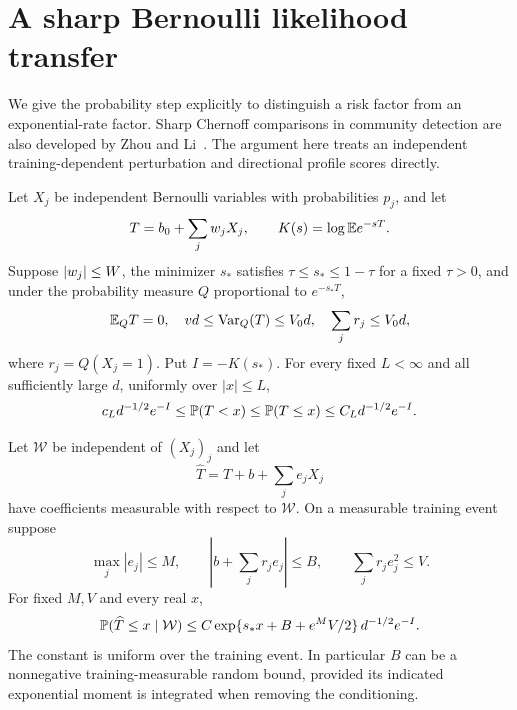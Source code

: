 \section{A sharp Bernoulli likelihood transfer}\label{sec:sharp}

We give the probability step explicitly to distinguish a risk factor from
an exponential-rate factor. Sharp Chernoff comparisons in community
detection are also developed by Zhou and Li~\cite{zhouli}.
The argument here treats an independent training-dependent perturbation
and directional profile scores directly.

\begin{lemma}
\label{lem:sharp}
Let $X_j$ be independent Bernoulli variables with probabilities $p_j$,
and let
\[
 T=b_0+\sum_jw_jX_j,\qquad
 K(s)=\log\mathbb E e^{-sT}.
\]
Suppose $\left\lvert w_j\right\rvert\le W$, the minimizer $s_*$ satisfies
$\tau\le s_*\le1-\tau$ for a fixed $\tau>0$, and under the probability
measure $Q$ proportional to $e^{-s_*T}$,
\begin{equation}\label{eq:sharp-premises}
 \mathbb E_Q T=0,\quad vd\le\operatorname{Var}_Q(T)\le V_0d,
 \quad\sum_jr_j\le V_0d,
\end{equation}
where $r_j=Q(X_j=1)$. Put $I=-K(s_*)$.
For every fixed $L<\infty$ and all sufficiently large $d$, uniformly over
$|x|\le L$,
\begin{equation}\label{eq:sharp-oracle}
 c_Ld^{-1/2}e^{-I}\le\mathbb P(T<x)
 \le\mathbb P(T\le x)\le C_Ld^{-1/2}e^{-I}.
\end{equation}

Let $\mathcal W$ be independent of $(X_j)_j$ and let
\[
 \widehat T=T+b+\sum_je_jX_j
\]
have coefficients measurable with respect to $\mathcal W$. On a measurable
training event suppose
\begin{equation}\label{eq:tilt-error}
 \max_j|e_j|\le M,\qquad
 \left|b+\sum_jr_je_j\right|\le B,\qquad
 \sum_jr_je_j^2\le V.
\end{equation}
For fixed $M,V$ and every real $x$,
\begin{equation}\label{eq:sharp-transfer}
 \mathbb P(\widehat T\le x\mid\mathcal W)
 \le C\exp\{s_*x+B+e^M V/2\}\,d^{-1/2}e^{-I}.
\end{equation}
The constant is uniform over the training event. In particular $B$ can
be a nonnegative training-measurable random bound, provided its indicated
exponential moment is integrated when removing the conditioning.
\end{lemma}


